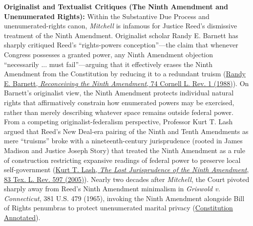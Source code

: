 \documentclass[12pt]{article}
\begin{document}
\textbf{Originalist and Textualist Critiques (The Ninth Amendment and Unenumerated Rights):} Within the Substantive Due Process and unenumerated-rights canon, \textit{Mitchell} is infamous for Justice Reed's dismissive treatment of the Ninth Amendment. Originalist scholar Randy E. Barnett has sharply critiqued Reed's ``rights-powers conception''---the claim that whenever Congress possesses a granted power, any Ninth Amendment objection ``necessarily ... must fail''---arguing that it effectively erases the Ninth Amendment from the Constitution by reducing it to a redundant truism (\href{https://scholarship.law.cornell.edu/cgi/viewcontent.cgi?article=3396&context=clr}{Randy E. Barnett, \textit{Reconceiving the Ninth Amendment}, 74 Cornell L. Rev. 1 (1988)}). On Barnett's originalist view, the Ninth Amendment protects individual natural rights that affirmatively constrain how enumerated powers may be exercised, rather than merely describing whatever space remains outside federal power. From a competing originalist-federalism perspective, Professor Kurt T. Lash argued that Reed's New Deal-era pairing of the Ninth and Tenth Amendments as mere ``truisms'' broke with a nineteenth-century jurisprudence (rooted in James Madison and Justice Joseph Story) that treated the Ninth Amendment as a rule of construction restricting expansive readings of federal power to preserve local self-government (\href{https://scholarship.richmond.edu/context/law-faculty-publications/article/2469/viewcontent/The_Lost_Jurisprudence_of_the_Ninth_Amendment__2005.pdf}{Kurt T. Lash, \textit{The Lost Jurisprudence of the Ninth Amendment}, 83 Tex. L. Rev. 597 (2005)}). Nearly two decades after \textit{Mitchell}, the Court pivoted sharply away from Reed's Ninth Amendment minimalism in \textit{Griswold v. Connecticut}, 381 U.S. 479 (1965), invoking the Ninth Amendment alongside Bill of Rights penumbras to protect unenumerated marital privacy (\href{https://constitution.congress.gov/browse/essay/amdt9-3/ALDE_00013643/}{Constitution Annotated}).
\end{document}
